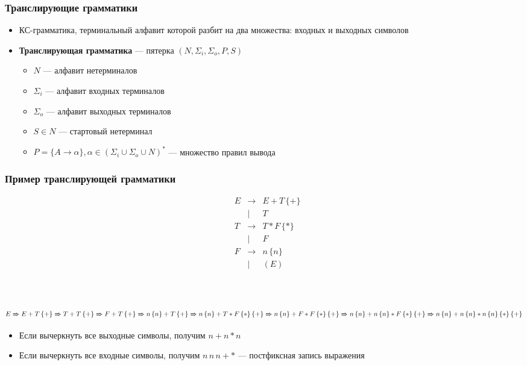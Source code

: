 \documentclass{beamer}
\newcommand{\derives}[0]{\xRightarrow[]{}}
\begin{document}
\begin{frame}[fragile]
  \transwipe[direction=90]
  \frametitle{Транслирующие грамматики}
  \begin{itemize}
    \item КС-грамматика, терминальный алфавит которой разбит на два множества: входных и выходных символов
    \item \textbf{Транслирующая грамматика} --- пятерка $(N, \Sigma_i, \Sigma_o, P, S)$
    \begin{itemize}
      \item $N$ --- алфавит нетерминалов
      \item $\Sigma_i$ --- алфавит входных терминалов
      \item $\Sigma_o$ --- алфавит выходных терминалов
      \item $S \in N$ --- стартовый нетерминал
      \item $P = \{ A \rightarrow \alpha \}, \alpha \in (\Sigma_i \cup \Sigma_o \cup N)^*$ --- множество правил вывода
    \end{itemize}
  \end{itemize}
\end{frame}

\begin{frame}[fragile]
  \transwipe[direction=90]
  \frametitle{Пример транслирующей грамматики}
$$
\begin{array}{cccl}
&E& \rightarrow & E + T \, \{ + \} \\
& &    |        & T   \\
&T& \rightarrow & T * F \, \{ * \} \\
& &    |        & F  \\
&F& \rightarrow & n \, \{ n \} \\
& &    |        & ( E ) \\
\end{array}
$$
\pause ~\\~

$E \derives E + T \, \{ + \} \derives T + T \, \{ + \} \derives F + T \, \{ + \} \derives n \, \{ n \} + T \, \{ + \} \derives n \, \{ n \} + T * F \, \{ * \} \, \{ + \} \derives n \, \{ n \} + F * F \, \{ * \} \, \{ + \} \derives n \, \{ n \} +  n \, \{ n \} * F \, \{ * \} \, \{ + \} \derives n \, \{ n \} +  n \, \{ n \} * n \, \{ n \} \, \{ * \} \, \{ + \}$

\pause
\begin{itemize}
  \item Если вычеркнуть все выходные символы, получим $n + n * n$
  \item Если вычеркнуть все входные символы, получим $n \, n \, n + *$ --- постфиксная запись выражения
\end{itemize}
\end{frame}
\end{document}

